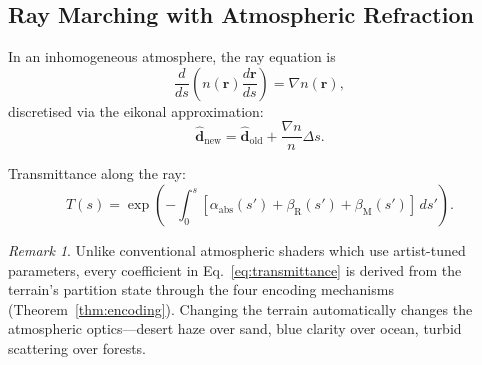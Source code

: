\documentclass[10pt,twocolumn]{article}
\theoremstyle{definition}
\theoremstyle{remark}
\newtheorem{remark}[theorem]{Remark}
\begin{document}
\subsection{Ray Marching with Atmospheric Refraction}
\label{sec:ray_march}

In an inhomogeneous atmosphere, the ray equation is
\begin{equation}\label{eq:ray_eq}
  \frac{d}{ds}\left(n(\mathbf{r})\frac{d\mathbf{r}}{ds}\right)
  = \nabla n(\mathbf{r}),
\end{equation}
discretised via the eikonal approximation:
\begin{equation}\label{eq:eikonal}
  \hat{\mathbf{d}}_{\mathrm{new}}
  = \hat{\mathbf{d}}_{\mathrm{old}}
  + \frac{\nabla n}{n}\Delta s.
\end{equation}

Transmittance along the ray:
\begin{equation}\label{eq:transmittance}
  T(s) = \exp\!\left(
  -\int_0^s[\alpha_{\mathrm{abs}}(s')
  +\beta_{\mathrm{R}}(s')+\beta_{\mathrm{M}}(s')]
  \,ds'\right).
\end{equation}

\begin{remark}
Unlike conventional atmospheric shaders
\citep{Nishita1993,Bruneton2008,Hillaire2020} which use
artist-tuned parameters, every coefficient in
Eq.~\eqref{eq:transmittance} is derived from the terrain's
partition state through the four encoding mechanisms
(Theorem~\ref{thm:encoding}).  Changing the terrain
automatically changes the atmospheric optics---desert haze
over sand, blue clarity over ocean, turbid scattering over
forests.
\end{remark}
\end{document}
